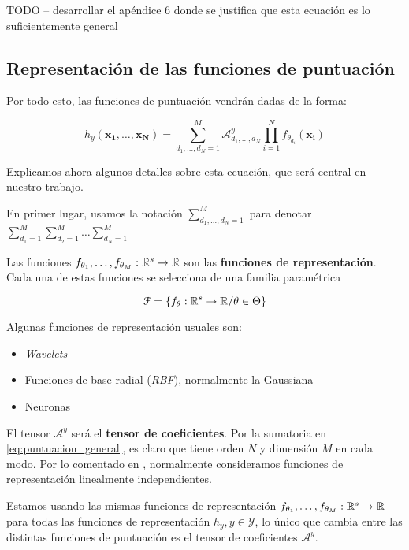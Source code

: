 TODO -- desarrollar el apéndice 6 donde se justifica que esta ecuación es lo suficientemente general

\subsection{Representación de las funciones de puntuación} \label{sec:repr_funciones_puntuacion}

Por todo esto, las funciones de puntuación vendrán dadas de la forma:

\begin{equation} \label{eq:puntuacion_general}
    h_y(\mathbf{x_1}, \ldots, \mathbf{x_N}) = \sum_{d_1, \ldots, d_N = 1}^{M} \mathcal{A}^y_{d_1, \ldots, d_N} \prod_{i = 1}^N f_{\theta_{d_i}}(\mathbf{x_i})
\end{equation}

Explicamos ahora algunos detalles sobre esta ecuación, que será central en nuestro trabajo.

En primer lugar, usamos la notación $\sum_{d_1, \ldots, d_N = 1}^{M}$ para denotar $\sum_{d_1 = 1}^{M} \sum_{d_2 = 1}^{M} \ldots \sum_{d_N = 1}^{M}$

Las funciones $f_{\theta_1}, \ldots, f_{\theta_M}: \mathbb{R}^s \to \mathbb{R}$ son las \textbf{funciones de representación}. Cada una de estas funciones se selecciona de una familia paramétrica

$$\mathcal{F} = \{ f_{\theta}: \mathbb{R}^s \to \mathbb{R} / \theta \in \Theta \}$$

Algunas funciones de representación usuales son:

\begin{itemize}
    \item \textit{Wavelets}
    \item Funciones de base radial (\textit{RBF}), normalmente la Gaussiana
    \item Neuronas
\end{itemize}

El tensor $\mathcal{A}^y$ será el \textbf{tensor de coeficientes}. Por la sumatoria en \eqref{eq:puntuacion_general}, es claro que tiene orden $N$ y dimensión $M$ en cada modo. Por lo comentado en , normalmente consideramos funciones de representación linealmente independientes.

Estamos usando las mismas funciones de representación $f_{\theta_1}, \ldots, f_{\theta_M}: \mathbb{R}^s \to \mathbb{R}$ para todas las funciones de representación $h_y, y \in \mathcal{Y}$, lo único que cambia entre las distintas funciones de puntuación es el tensor de coeficientes $\mathcal{A}^y$.


